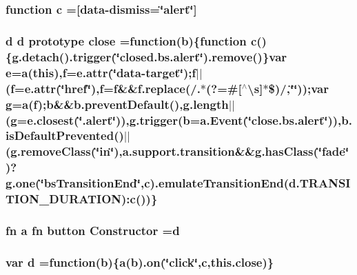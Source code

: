 \subsubsection[{c}]{\setlength{\rightskip}{0pt plus 5cm}function c =\textquotesingle{}[data-\/{\bf dismiss}=\char`\"{}alert\char`\"{}]\textquotesingle{}}\label{bootstrap_8min_8js_ad9d1ac02e33c4aed62ad517a7cb8b3fb}
\subsubsection[{close}]{ {\bf d} {\bf d} prototype close =function({\bf b})\{function {\bf c}()\{g.\+detach().trigger(\char`\"{}closed.\+bs.\+alert\char`\"{}).remove()\}var {\bf e}={\bf a}(this),f=e.\+attr(\char`\"{}data-\/target\char`\"{});f$\vert$$\vert$(f=e.\+attr(\char`\"{}href\char`\"{}),f=f\&\&f.\+replace(/.$\ast$(?=\#[$^\wedge$\textbackslash{}s]$\ast$\$)/,\char`\"{}\char`\"{}));var g={\bf a}(f);{\bf b}\&\&b.\+prevent\+Default(),g.\+length$\vert$$\vert$(g=e.\+closest(\char`\"{}.alert\char`\"{})),g.\+trigger({\bf b}=a.\+Event(\char`\"{}close.\+bs.\+alert\char`\"{})),b.\+is\+Default\+Prevented()$\vert$$\vert$(g.\+remove\+Class(\char`\"{}in\char`\"{}),a.\+support.\+transition\&\&{\bf g.\+has\+Class}(\char`\"{}fade\char`\"{})?g.\+one(\char`\"{}bs\+Transition\+End\char`\"{},c).{\bf emulate\+Transition\+End}({\bf d.\+T\+R\+A\+N\+S\+I\+T\+I\+O\+N\+\_\+\+D\+U\+R\+A\+T\+I\+O\+N})\+:{\bf c}())\}}\label{bootstrap_8min_8js_a72fbb3628c3cc943ced8aad64247888c}
\subsubsection[{Constructor}]{ fn {\bf a} fn {\bf button} Constructor ={\bf d}}\label{bootstrap_8min_8js_a0545907c609a48549a0cf5d4c692f851}
\subsubsection[{d}]{\setlength{\rightskip}{0pt plus 5cm}var d =function({\bf b})\{{\bf a}({\bf b}).on(\char`\"{}click\char`\"{},c,{\bf this.\+close})\}}\label{bootstrap_8min_8js_aeb337d295abaddb5ec3cb34cc2e2bbc9}
